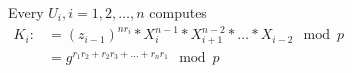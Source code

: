 \documentclass[varwidth,convert={size=1000x}]{standalone}
\begin{document}
Every $U_i, i = 1, 2, \dots, n$ computes\\
$\begin{aligned}
	K_i :&= (z_{i-1})^{nr_i} * X_i^{n-1} * X_{i+1}^{n-2} * \dots * X_{i-2} \mod p\\
			&= g^{r_1r_2 + r_2r_3 + \dots + r_nr_1} \mod p
\end{aligned}$
\end{document}
